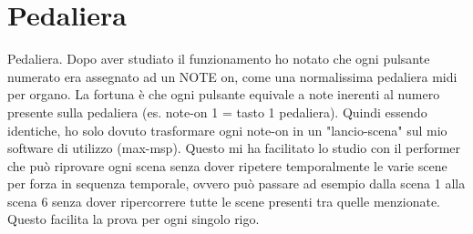 \section{Pedaliera}

Pedaliera. Dopo aver studiato il funzionamento ho notato che ogni pulsante numerato era assegnato ad un NOTE on, come una normalissima pedaliera midi per organo. La fortuna è che ogni pulsante equivale a note inerenti al numero presente sulla pedaliera (es. note-on 1 = tasto 1 pedaliera). Quindi essendo identiche, ho solo dovuto trasformare ogni note-on in un "lancio-scena" sul mio software di utilizzo (max-msp). Questo mi ha facilitato lo studio con il performer che può riprovare ogni scena senza dover ripetere temporalmente le varie scene per forza in  sequenza temporale, ovvero può passare ad esempio dalla scena 1 alla scena 6 senza dover ripercorrere tutte le scene presenti tra quelle menzionate. Questo facilita la prova per ogni singolo rigo.
